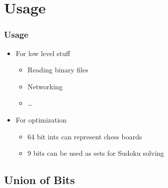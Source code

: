 \section{Usage}
\frame{\tableofcontents[currentsection]}

\begin{frame}
  \frametitle{Usage}
  \begin{itemize}
    \item For low level stuff
          \begin{itemize}
            \item Reading binary files
            \item Networking
            \item \dots
          \end{itemize}
    \item For optimization
          \begin{itemize}
            \item 64 bit ints can represent chess boards
            \item 9 bits can be used as sets for Sudoku solving
          \end{itemize}
  \end{itemize}
\end{frame}

\subsection{Union of Bits}
\frame{\tableofcontents[currentsubsection]}

